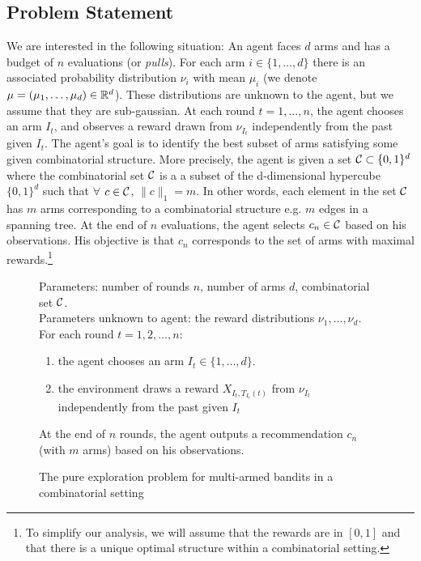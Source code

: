 \documentclass[11.75pt,oneside]{amsart}
\begin{document}
\subsection{Problem Statement} 

We are interested in the following situation: An agent faces $d$ arms and has a budget of $n$ evaluations (or \emph{pulls}). For each arm $i \in \{1, \hdots, d\}$ there is an associated probability distribution $\nu_i$ with mean $\mu_i$ (we denote $\mu=(\mu_1, \hdots, \mu_d) \in \mathbb{R}^d$). These distributions are unknown to the agent, but we assume that they are sub-gaussian. At each round $t = 1, \hdots, n$, the agent chooses an arm $I_t$, and observes a reward drawn from $\nu_{I_t}$ independently from the past given $I_t$. The agent's goal is to identify the best subset of arms satisfying some given combinatorial structure. More precisely, the agent is given a set $\mathcal{C} \subset \{0,1\}^d$ where the combinatorial set $\mathcal{C}$ is a a subset of the d-dimensional hypercube $\{0,1\}^d$ such that $\forall$ $c \in \mathcal{C}$, $\|c\|_{1} = m$. In other words, each element in the set $\mathcal{C}$ has $m$ arms corresponding to a combinatorial structure e.g. $m$ edges in a spanning tree. At the end of $n$ evaluations, the agent selects  $c_n \in \mathcal{C}$ based on his observations. His objective is that $c_n$ corresponds to the set of arms with maximal rewards.\footnote{To simplify our analysis, we will assume that the rewards are in $[0,1]$ and that there is a unique optimal structure within a combinatorial setting.}

\begin{figure}[ht]
\raggedright
Parameters: number of rounds $n$, number of arms $d$, combinatorial set $\mathcal{C}$.\\
\vspace{5pt}
Parameters unknown to agent: the reward distributions $\nu_1, \hdots, \nu_d$.\\
\vspace{5pt}
For each round $t=1,2, \hdots ,n$:
\vspace{5pt}
\begin{enumerate}
\item{the agent chooses an arm $I_t \in \{1, \hdots, d\}$.}
\vspace{5pt}
\item{the environment draws a reward $X_{I_t, T_{I_t}(t)}$ from $\nu_{I_t}$ independently from the past given $I_t$}
\end{enumerate}
\vspace{5pt}
At the end of $n$ rounds, the agent outputs a recommendation $c_n$ (with $m$ arms) based on his observations.
\caption{\label{pureexplore} The pure exploration problem for multi-armed bandits in a combinatorial setting}
\end{figure}
\end{document}
